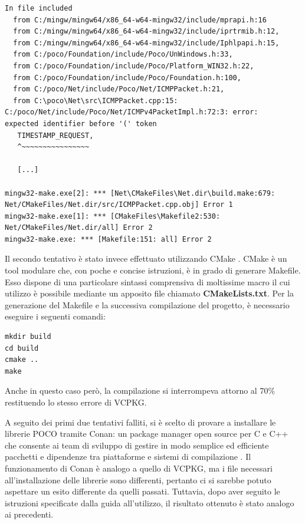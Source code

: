 \begin{verbatim}
In file included 
  from C:/mingw/mingw64/x86_64-w64-mingw32/include/mprapi.h:16       
  from C:/mingw/mingw64/x86_64-w64-mingw32/include/iprtrmib.h:12,
  from C:/mingw/mingw64/x86_64-w64-mingw32/include/Iphlpapi.h:15,
  from C:/poco/Foundation/include/Poco/UnWindows.h:33,
  from C:/poco/Foundation/include/Poco/Platform_WIN32.h:22,
  from C:/poco/Foundation/include/Poco/Foundation.h:100,
  from C:/poco/Net/include/Poco/Net/ICMPPacket.h:21,
  from C:\poco\Net\src\ICMPPacket.cpp:15:
C:/poco/Net/include/Poco/Net/ICMPv4PacketImpl.h:72:3: error: 
expected identifier before '(' token
   TIMESTAMP_REQUEST,
   ^~~~~~~~~~~~~~~~~
   
   [...]
   
mingw32-make.exe[2]: *** [Net\CMakeFiles\Net.dir\build.make:679:
Net/CMakeFiles/Net.dir/src/ICMPPacket.cpp.obj] Error 1
mingw32-make.exe[1]: *** [CMakeFiles\Makefile2:530: 
Net/CMakeFiles/Net.dir/all] Error 2
mingw32-make.exe: *** [Makefile:151: all] Error 2
\end{verbatim}

Il secondo tentativo è stato invece effettuato utilizzando CMake \cite{CMake}. CMake è un tool modulare che, con poche e concise istruzioni, è in grado di generare Makefile. Esso dispone di una particolare sintassi comprensiva di moltissime macro il cui utilizzo è possibile mediante un apposito file chiamato  \textbf{CMakeLists.txt}. Per la generazione del Makefile e la successiva compilazione del progetto, è necessario eseguire i seguenti comandi:

\begin{verbatim}
mkdir build
cd build
cmake ..
make
\end{verbatim}

Anche in questo caso però, la compilazione si interrompeva attorno al 70\% restituendo lo stesso errore di VCPKG.

A seguito dei primi due tentativi falliti, si è scelto di provare a installare le librerie POCO tramite Conan: un package manager open source per C e C++ che consente ai team di sviluppo di gestire in modo semplice ed efficiente pacchetti e dipendenze tra piattaforme e sistemi di compilazione \cite{Conan}. Il funzionamento di Conan è analogo a quello di VCPKG, ma i file necessari all'installazione delle librerie sono differenti, pertanto ci si sarebbe potuto aspettare un esito differente da quelli passati. Tuttavia, dopo aver seguito le istruzioni specificate dalla guida all'utilizzo, il risultato ottenuto è stato analogo ai precedenti.
